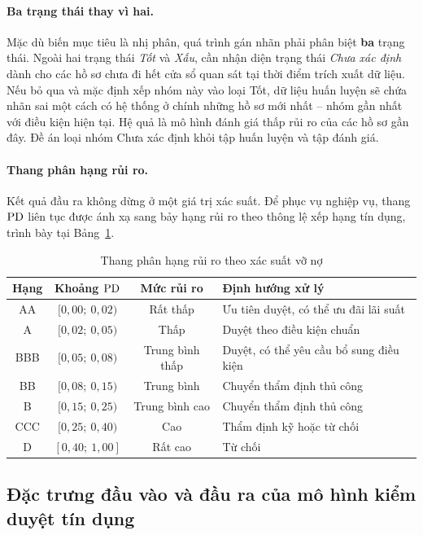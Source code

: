 \paragraph{Ba trạng thái thay vì hai.} Mặc dù biến mục tiêu là nhị phân, quá
trình gán nhãn phải phân biệt \textbf{ba} trạng thái. Ngoài hai trạng thái
\textit{Tốt} và \textit{Xấu}, cần nhận diện trạng thái \textit{Chưa xác định}
dành cho các hồ sơ chưa đi hết cửa sổ quan sát tại thời điểm trích xuất dữ liệu.
Nếu bỏ qua và mặc định xếp nhóm này vào loại Tốt, dữ liệu huấn luyện sẽ chứa nhãn
sai một cách có hệ thống ở chính những hồ sơ mới nhất -- nhóm gần nhất với điều
kiện hiện tại. Hệ quả là mô hình đánh giá thấp rủi ro của các hồ sơ gần đây. Đề
án loại nhóm Chưa xác định khỏi tập huấn luyện và tập đánh giá.

\paragraph{Thang phân hạng rủi ro.} Kết quả đầu ra không dừng ở một giá trị xác
suất. Để phục vụ nghiệp vụ, thang $\mathrm{PD}$ liên tục được ánh xạ sang bảy hạng rủi ro
theo thông lệ xếp hạng tín dụng, trình bày tại Bảng~\ref{tab:risk-bands-design}.

\begin{table}[htbp]
\centering
\caption{Thang phân hạng rủi ro theo xác suất vỡ nợ}
\label{tab:risk-bands-design}
\small
\begin{tabular}{@{}cccl@{}}
\toprule
\textbf{Hạng} & \textbf{Khoảng $\mathrm{PD}$} & \textbf{Mức rủi ro} &
\textbf{Định hướng xử lý} \\
\midrule
AA  & $[0{,}00;\ 0{,}02)$ & Rất thấp    & Ưu tiên duyệt, có thể ưu đãi lãi suất \\
A   & $[0{,}02;\ 0{,}05)$ & Thấp        & Duyệt theo điều kiện chuẩn \\
BBB & $[0{,}05;\ 0{,}08)$ & Trung bình thấp & Duyệt, có thể yêu cầu bổ sung điều kiện \\
BB  & $[0{,}08;\ 0{,}15)$ & Trung bình  & Chuyển thẩm định thủ công \\
B   & $[0{,}15;\ 0{,}25)$ & Trung bình cao & Chuyển thẩm định thủ công \\
CCC & $[0{,}25;\ 0{,}40)$ & Cao         & Thẩm định kỹ hoặc từ chối \\
D   & $[0{,}40;\ 1{,}00]$ & Rất cao     & Từ chối \\
\bottomrule
\end{tabular}
\end{table}

\subsection{Đặc trưng đầu vào và đầu ra của mô hình kiểm duyệt tín dụng}
\label{subsec:dau-vao-dau-ra}

